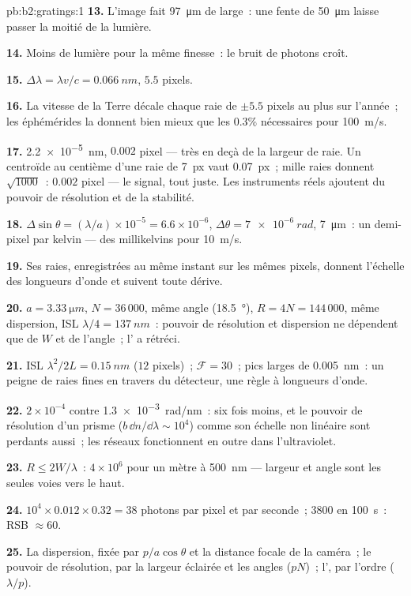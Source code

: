 \begin{solution}{pb:b2:gratings:1}
\textbf{13.} L'image fait \qty{97}{\micro m} de large~: une fente de \qty{50}{\micro m} laisse passer
la moitié de la lumière.

\textbf{14.} Moins de lumière pour la même finesse~: le bruit de photons croît.

\textbf{15.} $\Delta\lambda = \lambda v/c = \qty{0.066}{nm}$, $5.5$ pixels.

\textbf{16.} La vitesse de la Terre décale chaque raie de $\pm5.5$
pixels au plus sur l'année~; les éphémérides la donnent bien
mieux que les $0.3\%$ nécessaires pour \qty{100}{m/s}.

\textbf{17.} \qty{2.2e-5}{nm}, $0.002$ pixel --- très en deçà de la largeur de raie. Un
centroïde au centième d'une raie de \qty{7}{px} vaut \qty{0.07}{px}~; mille
raies donnent $\sqrt{1000}$~: $0.002$ pixel --- le signal, tout juste. Les instruments
réels ajoutent du pouvoir de résolution et de la stabilité.

\textbf{18.} $\Delta\sin\theta = (\lambda/a) \times 10^{-5} = 6.6 \times 10^{-6}$, $\Delta\theta = \qty{7e-6}{rad}$,
\qty{7}{\micro m}~: un demi-pixel par kelvin --- des millikelvins pour \qty{10}{m/s}.

\textbf{19.} Ses raies, enregistrées au même instant sur les mêmes
pixels, donnent l'échelle des longueurs d'onde et suivent toute dérive.

\textbf{20.} $a = \qty{3.33}{\micro m}$, $N = 36\,000$, même angle (\qty{18.5}{\degree}), $R = 4N
= 144\,000$, même dispersion, ISL $\lambda/4 = \qty{137}{nm}$~: pouvoir de résolution et
dispersion ne dépendent que de $W$ et de l'angle~; l'
a rétréci.

\textbf{21.} ISL $\lambda^2/2L = \qty{0.15}{nm}$ ($12$ pixels)~; $\mathcal F = 30$~; pics
larges de \qty{0.005}{nm}~: un peigne de raies fines en travers du détecteur, une
règle à longueurs d'onde.

\textbf{22.} $2 \times 10^{-4}$ contre \qty{1.3e-3}{rad/nm}~: six fois moins, et le
pouvoir de résolution d'un prisme ($b\,\dd n/\dd\lambda \sim 10^4$) comme son échelle non linéaire
sont perdants aussi~; les réseaux fonctionnent en outre dans l'ultraviolet.

\textbf{23.} $R \le 2W/\lambda$~: $4 \times 10^6$ pour un mètre à \qty{500}{nm} --- largeur et
angle sont les seules voies vers le haut.

\textbf{24.} $10^4 \times 0.012 \times 0.32 = 38$ photons par pixel et par seconde~; $3800$
en \qty{100}{s}~: RSB $\approx 60$.

\textbf{25.} La dispersion, fixée par $p/a\cos\theta$ et la distance focale de la caméra~;
le pouvoir de résolution, par la largeur éclairée et les angles ($pN$)~;
l', par l'ordre ($\lambda/p$).
\end{solution}
